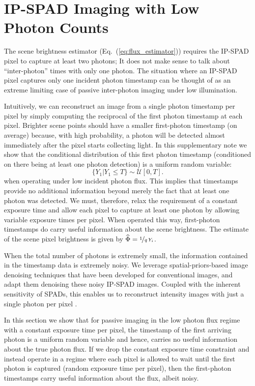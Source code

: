 \section{IP-SPAD Imaging with Low Photon Counts\label{suppl:timing_usefulness}}
The scene brightness estimator (Eq.~(\ref{eq:flux_estimator})) 
requires the IP-SPAD pixel to capture at least two photons; It
does not make sense to talk about ``inter-photon'' times with only one photon.
The situation where an IP-SPAD pixel captures only one incident photon
timestamp can be thought of as an extreme limiting case of passive inter-photon
imaging under low illumination. 

Intuitively, we can reconstruct an image from a single photon timestamp per
pixel by simply computing the reciprocal of the first photon timestamp at each
pixel. Brighter scene points should have a smaller first-photon timestamp (on
average) because, with high probability, a photon will be detected almost
immediately after the pixel starts collecting light.  In this supplementary
note we show that the conditional distribution of this first photon timestamp
(conditioned on there being at least one photon detection) is a uniform random
variable:
\[
  \{Y_1 | Y_1 \leq T\} \sim \mathcal{U}[0,T].
\]
when operating under low incident photon flux. This implies that timestamps
provide no additional information beyond merely the fact that at least one
photon was detected. We must, therefore, relax the requirement of a constant
exposure time and allow each pixel to capture at least one photon by allowing
variable exposure times per pixel. When operated this way, first-photon
timestamps do carry useful information about the scene brightness.  The
estimate of the scene pixel brightness is given by $\widehat \Phi =
\nicefrac{1}{q\,Y_i}$.

When the total number of photons is extremely small, the information contained
in the timestamp data is extremely noisy.  We leverage spatial-priors-based
image denoising techniques that have been developed for conventional images,
and adapt them denoising these noisy IP-SPAD images.  Coupled with the inherent
sensitivity of SPADs, this enables us to reconstruct intensity images with just
a single photon per pixel \cite{Johnson_2020}.

In this section we show that for passive imaging in the low photon flux regime
with a constant exposure time per pixel, the timestamp of the first arriving
photon is a uniform random variable and hence, carries no useful information
about the true photon flux. If we drop the constant exposure time constraint
and instead operate in a regime where each pixel is allowed to wait until the
first photon is captured (random exposure time per pixel), then the
first-photon timestamps carry useful information about the flux, albeit noisy.

